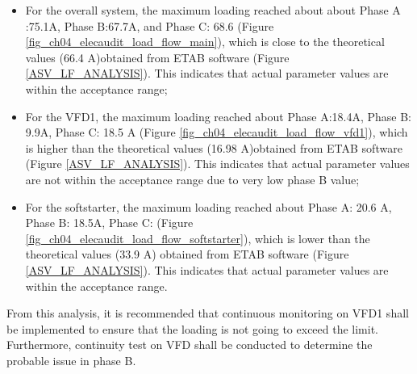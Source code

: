\begin{itemize}
\item For the overall system, the maximum loading reached about about Phase A :75.1A, Phase B:67.7A, and Phase C: 68.6 (Figure \ref{fig_ch04_elecaudit_load_flow_main}), which is close to the theoretical values (66.4 A)obtained from ETAB software (Figure \ref{ASV_LF_ANALYSIS}). This indicates that actual parameter values are within the acceptance range;

\item For the VFD1, the maximum loading reached about Phase A:18.4A, Phase B: 9.9A, Phase C: 18.5 A  (Figure \ref{fig_ch04_elecaudit_load_flow_vfd1}), which is higher than the theoretical values (16.98 A)obtained from ETAB software (Figure \ref{ASV_LF_ANALYSIS}). This indicates that actual parameter values are not within the acceptance range due to very low phase B value;

\item For the softstarter, the maximum loading reached about Phase A: 20.6 A, Phase B: 18.5A, Phase C:  (Figure \ref{fig_ch04_elecaudit_load_flow_softstarter}), which is lower than the theoretical values (33.9 A) obtained from ETAB software (Figure \ref{ASV_LF_ANALYSIS}). This indicates that actual parameter values are within the acceptance range.

\end{itemize}

From this analysis, it is recommended that continuous monitoring on VFD1 shall be implemented to ensure that the loading is not going to exceed the limit. Furthermore, continuity test on VFD shall be conducted to determine the probable issue in phase B. 


